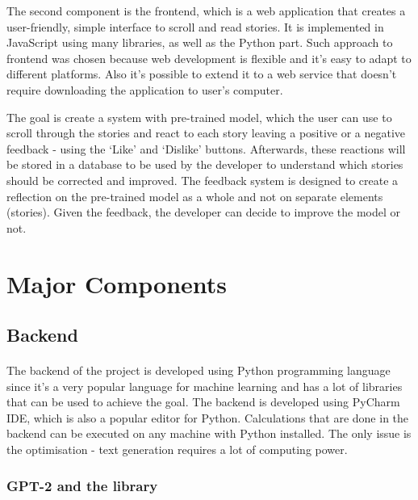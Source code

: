 \documentclass[12pt]{report}
\begin{document}
The second component is the frontend, which is a web application that creates a user-friendly, simple interface
to scroll and read stories. It is implemented in JavaScript using many libraries, as well as the Python part.
Such approach to frontend was chosen because web development is flexible and it's easy to adapt to different
platforms. Also it's possible to extend it to a web service that doesn't require downloading the application
to user's computer.

The goal is create a system with pre-trained model, which the user can use to scroll through the stories and 
react to each story leaving a positive or a negative feedback - using the `Like' and `Dislike' buttons. Afterwards,
these reactions will be stored in a database to be used by the developer to understand which stories should be
corrected and improved. The feedback system is designed to create a reflection on the pre-trained model as a whole and
not on separate elements (stories). Given the feedback, the developer can decide to improve the model or not.

\section*{Major Components}

\subsection*{Backend}
\paragraph{}
The backend of the project is developed using Python programming language since it's a very popular language for machine learning
and has a lot of libraries that can be used to achieve the goal. The backend is developed using PyCharm IDE, which is also
a popular editor for Python. Calculations that are done in the backend can be executed on any machine with Python 
installed. The only issue is the optimisation - text generation requires a lot of computing power.

\subsubsection*{GPT-2 and the library}
\end{document}
